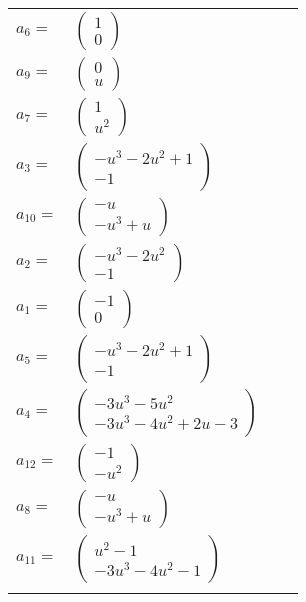 \documentclass[1p]{elsarticle_modified}
\theoremstyle{definition}
\begin{document}
\begin{tabular}{m{7pt} m{180pt} m{7pt} m{180pt} }
\flushright $a_{6}=$&$\begin{pmatrix}1\\0\end{pmatrix}$ \\
\flushright $a_{9}=$&$\begin{pmatrix}0\\u\end{pmatrix}$ \\
\flushright $a_{7}=$&$\begin{pmatrix}1\\u^2\end{pmatrix}$ \\
\flushright $a_{3}=$&$\begin{pmatrix}- u^3-2 u^2+1\\-1\end{pmatrix}$ \\
\flushright $a_{10}=$&$\begin{pmatrix}- u\\- u^3+u\end{pmatrix}$ \\
\flushright $a_{2}=$&$\begin{pmatrix}- u^3-2 u^2\\-1\end{pmatrix}$ \\
\flushright $a_{1}=$&$\begin{pmatrix}-1\\0\end{pmatrix}$ \\
\flushright $a_{5}=$&$\begin{pmatrix}- u^3-2 u^2+1\\-1\end{pmatrix}$ \\
\flushright $a_{4}=$&$\begin{pmatrix}-3 u^3-5 u^2\\-3 u^3-4 u^2+2 u-3\end{pmatrix}$ \\
\flushright $a_{12}=$&$\begin{pmatrix}-1\\- u^2\end{pmatrix}$ \\
\flushright $a_{8}=$&$\begin{pmatrix}- u\\- u^3+u\end{pmatrix}$ \\
\flushright $a_{11}=$&$\begin{pmatrix}u^2-1\\-3 u^3-4 u^2-1\end{pmatrix}$\\&\end{tabular}
\end{document}
